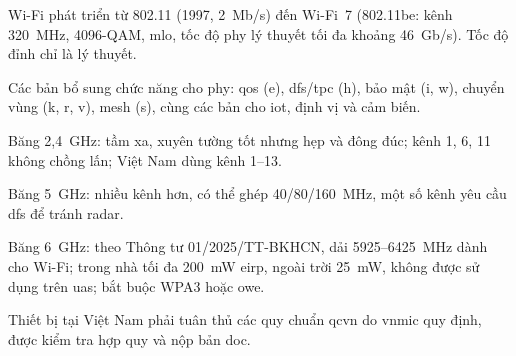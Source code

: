 \begin{tomtat}
\item Wi-Fi phát triển từ 802.11 (1997, 2~Mb/s) đến Wi-Fi~7 (802.11be: kênh 320~MHz, 4096-QAM, \acs{mlo}, tốc độ \acs{phy} lý thuyết tối đa khoảng 46~Gb/s). Tốc độ đỉnh chỉ là lý thuyết.
\item Các bản bổ sung chức năng cho \acs{phy}: \acs{qos} (e), \acs{dfs}/\acs{tpc} (h), bảo mật (i, w), chuyển vùng (k, r, v), mesh (s), cùng các bản cho \acs{iot}, định vị và cảm biến.
\item Băng 2,4~GHz: tầm xa, xuyên tường tốt nhưng hẹp và đông đúc; kênh 1, 6, 11 không chồng lấn; Việt Nam dùng kênh 1--13.
\item Băng 5~GHz: nhiều kênh hơn, có thể ghép 40/80/160~MHz, một số kênh yêu cầu \acs{dfs} để tránh radar.
\item Băng 6~GHz: theo Thông tư 01/2025/TT-BKHCN, dải 5925--6425~MHz dành cho Wi-Fi; trong nhà tối đa 200~mW \acs{eirp}, ngoài trời 25~mW, không được sử dụng trên \acs{uas}; bắt buộc WPA3 hoặc \acs{owe}.
\item Thiết bị tại Việt Nam phải tuân thủ các quy chuẩn \acs{qcvn} do \acs{vnmic} quy định, được kiểm tra hợp quy và nộp bản \acs{doc}.
\end{tomtat}
\endgroup
